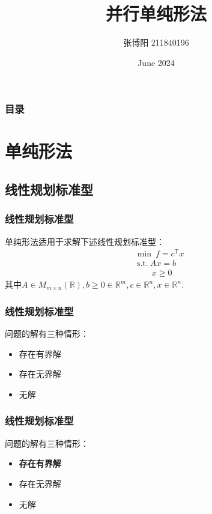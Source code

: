 \documentclass{beamer}
\title{并行单纯形法}
\author{张博阳 211840196}
\date{June 2024}
\begin{document}
\frame{\titlepage}

\begin{frame}
    \frametitle{目录}
    \tableofcontents
\end{frame}

\section{单纯形法}
\subsection{线性规划标准型}
\begin{frame}
    \frametitle{线性规划标准型}
    单纯形法适用于求解下述线性规划标准型：
    \begin{align*}
         & \min\ f=c^\mathrm{T}x \\
         & \ \mathrm{s.t.}\ Ax=b \\
         & \qquad x \ge 0
    \end{align*}
    其中$A\in M_{m\times n}(\mathbb{R}),b \ge 0 \in \mathbb{R}^m,c \in \mathbb{R}^n,x \in \mathbb{R}^n$.
\end{frame}

\begin{frame}
    \frametitle{线性规划标准型}
    问题的解有三种情形：
    \begin{itemize}
        \item 存在有界解
        \item 存在无界解
        \item 无解
    \end{itemize}
\end{frame}

\begin{frame}
    \frametitle{线性规划标准型}
    问题的解有三种情形：
    \begin{itemize}
        \item \textbf{存在有界解}
        \item 存在无界解
        \item 无解
    \end{itemize}
\end{frame}
\end{document}
